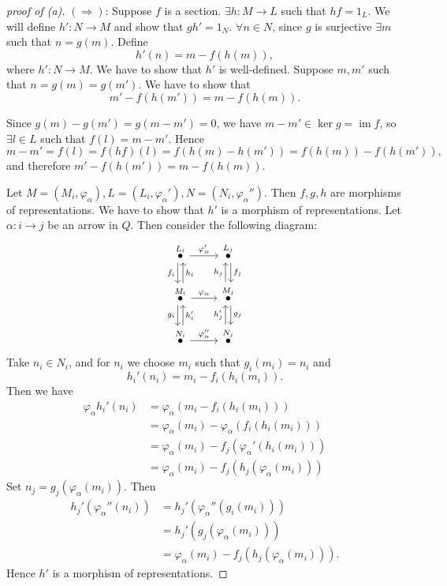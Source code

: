 \documentclass[11pt, a4paper]{report}
\begin{document}
\begin{proof}[proof of (a)]
    $(\Rightarrow )$: Suppose $f$ is a section. $\exists h: M\to L$ such that $hf=1_L$. We will define $h': N\to M$ and show that $gh'=1_N$. $\forall n \in N$, since $g$ is surjective $\exists m$ such that $n =g(m)$. Define
    \[
        h'(n)= m - f(h(m)),
    \]
    where $h': N\to M$. We have to show that $h'$ is well-defined. Suppose $m,m'$ such that $n=g(m)=g(m')$. We have to show that
    \[
        m'-f(h(m'))=m-f(h(m)).
    \]

    Since $g(m)-g(m') = g(m-m')=0$, we have $m-m' \in \operatorname{ker}g = \operatorname{im}f$, so $\exists l \in L$ such that $f(l)=m-m'$. Hence
    \[
        m-m'=f(l)= f(hf)(l)= f(h(m)-h(m'))=f(h(m))-f(h(m')),
    \]
    and therefore $m'-f(h(m'))=m-f(h(m))$.

    Let $M=(M_i,\varphi_\alpha), L=(L_i,\varphi_\alpha'), N=(N_i, \varphi_\alpha'')$. Then $f,g,h$ are morphisms of representations. We have to show that $h'$ is a morphism of representations. Let $\alpha: i \to j$ be an arrow in $Q$. Then consider the following diagram:
    \[
        \begin{tikzcd}
            \overset{L_i}{\bullet} \arrow[d, "f_i"', shift right] \arrow[r, "\varphi_{\alpha}'"]                               & \overset{L_j}{\bullet} \arrow[d, "f_j", shift left]                              \\
            \overset{M_i}{\bullet} \arrow[d, "g_i"', shift right] \arrow[r, "\varphi_{\alpha}"] \arrow[u, "h_i"', shift right] & \overset{M_j}{\bullet} \arrow[d, "g_j", shift left] \arrow[u, "h_j", shift left] \\
            \overset{N_i}{\bullet} \arrow[r, "\varphi_{\alpha}''"] \arrow[u, "h_i'"', shift right]                             & \overset{N_j}{\bullet} \arrow[u, "h_j'", shift left]
        \end{tikzcd}
    \]
    Take $n_i \in N_i$, and for $n_i$ we choose $m_i$ such that $g_i(m_i)=n_i$ and
    \[
        h_i'(n_i)=m_i-f_i(h_i(m_i)).
    \]
    Then we have
    \begin{align*}
        \varphi_\alpha h_i' (n_i) & =\varphi_\alpha (m_i-f_i(h_i(m_i)))                   \\
                                  & =\varphi_\alpha (m_i)-\varphi_\alpha (f_i(h_i(m_i)))  \\
                                  & =\varphi_\alpha (m_i)-f_j(\varphi_\alpha' (h_i(m_i))) \\
                                  & =\varphi_\alpha (m_i)-f_j(h_j(\varphi_\alpha(m_i)))
    \end{align*}
    Set $n_j=g_j(\varphi_\alpha(m_i))$. Then
    \begin{align*}
        h_j'(\varphi_\alpha''(n_i)) & =h_j'(\varphi_\alpha''(g_i(m_i)))                  \\
                                    & =h_j'(g_j(\varphi_\alpha(m_i)))                    \\
                                    & =\varphi_\alpha(m_i)-f_j(h_j(\varphi_\alpha(m_i))).
    \end{align*}
    Hence $h'$ is a morphism of representations.


\end{proof}
\end{document}
